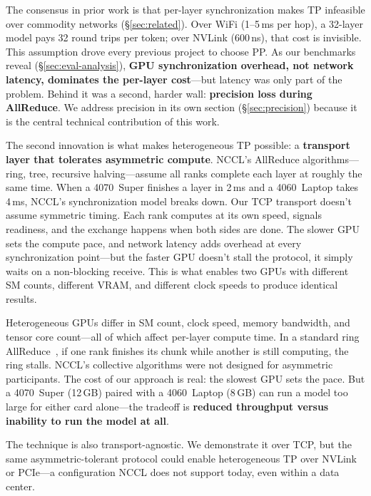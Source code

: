 \documentclass[10pt,twocolumn]{article}
\begin{document}
The consensus in prior work is that per-layer synchronization makes TP
infeasible over commodity networks (\S\ref{sec:related}).  Over WiFi
(1--5\,ms per hop), a 32-layer model pays 32 round trips per token; over
NVLink (600\,ns), that cost is invisible.  This assumption drove every
previous project to choose PP\@.  As our benchmarks reveal
(\S\ref{sec:eval-analysis}), \textbf{GPU synchronization overhead, not
network latency, dominates the per-layer cost}---but latency was only part
of the problem.  Behind it was a second, harder wall: \textbf{precision
loss during AllReduce}.  We address precision in its own section
(\S\ref{sec:precision}) because it is the central technical contribution
of this work.

The second innovation is what makes heterogeneous TP possible: a
\textbf{transport layer that tolerates asymmetric compute}.  NCCL's
AllReduce algorithms---ring, tree, recursive halving---assume all ranks
complete each layer at roughly the same time.  When a 4070~Super finishes
a layer in 2\,ms and a 4060~Laptop takes 4\,ms, NCCL's synchronization
model breaks down.  Our TCP transport doesn't assume symmetric timing.
Each rank computes at its own speed, signals readiness, and the exchange
happens when both sides are done.  The slower GPU sets the compute pace,
and network latency adds overhead at every synchronization point---but the
faster GPU doesn't stall the protocol, it simply waits on a non-blocking
receive.  This is what enables two GPUs with different SM counts, different
VRAM, and different clock speeds to produce identical results.

Heterogeneous GPUs differ in SM count, clock speed, memory bandwidth, and
tensor core count---all of which affect per-layer compute time.  In a
standard ring AllReduce~\citep{gibiansky2017hpc}, if one rank finishes its
chunk while another is still computing, the ring stalls.  NCCL's
collective algorithms were not designed for asymmetric participants.  The
cost of our approach is real: the slowest GPU sets the pace.  But a
4070~Super (12\,GB) paired with a 4060~Laptop (8\,GB) can run a model too
large for either card alone---the tradeoff is \textbf{reduced throughput
versus inability to run the model at all}.

The technique is also transport-agnostic.  We demonstrate it over TCP, but
the same asymmetric-tolerant protocol could enable heterogeneous TP over
NVLink or PCIe---a configuration NCCL does not support today, even within
a data center.

\end{document}
